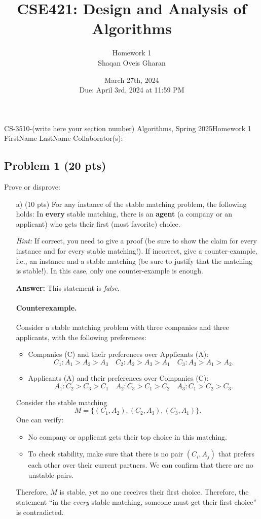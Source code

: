 \documentclass[12pt]{article}
\title{\textbf{CSE421: Design and Analysis of Algorithms}}
\author{Homework 1 \\ Shaqan Oveis Gharan}
\date{March 27th, 2024 \\ Due: April 3rd, 2024 at 11:59 PM}
\begin{document}
\noindent CS-3510-(write here your section number) Algorithms, Spring 2025\hfill Homework 1\\
FirstName LastName \hfill Collaborator(s):

\hrulefill

\subsection*{Problem 1 (20 pts)}

Prove or disprove:

\begin{enumerate}
    \item[a)] (10 pts) For any instance of the stable matching problem, the following holds: In \textbf{every} stable matching, there is an \textbf{agent} (a company or an applicant) who gets their first (most favorite) choice. 
    
    \textit{Hint:} If correct, you need to give a proof (be sure to show the claim for every instance and for every stable matching!). If incorrect, give a counter-example, i.e., an instance and a stable matching (be sure to justify that the matching is stable!). In this case, only one counter-example is enough.

    \noindent \textbf{Answer:} 
This statement is \emph{false}.

\paragraph{Counterexample.} 
Consider a stable matching problem with three companies and three applicants, with the following preferences:

\begin{itemize}
    \item Companies (C) and their preferences over Applicants (A):
    \[
    C_1: A_1 > A_2 > A_3 \quad
    C_2: A_2 > A_3 > A_1 \quad
    C_3: A_3 > A_1 > A_2.
    \]
    \item Applicants (A) and their preferences over Companies (C):
    \[
    A_1: C_2 > C_3 > C_1 \quad
    A_2: C_3 > C_1 > C_2 \quad
    A_3: C_1 > C_2 > C_3.
    \]
\end{itemize}

Consider the stable matching 
\[
M = \bigl\{(C_1, A_2), (C_2, A_3), (C_3, A_1)\bigr\}.
\]
One can verify:
\begin{itemize}
    \item No company or applicant gets their top choice in this matching.
    \item To check stability, make sure that there is no pair $(C_i, A_j)$ that prefers each other over their current partners. We can confirm that there are no unstable pairs.
\end{itemize}
Therefore, $M$ is stable, yet no one receives their first choice. 
Therefore, the statement ``in the \emph{every} stable matching, someone must get their first choice'' is contradicted.


\end{enumerate}
\end{document}
